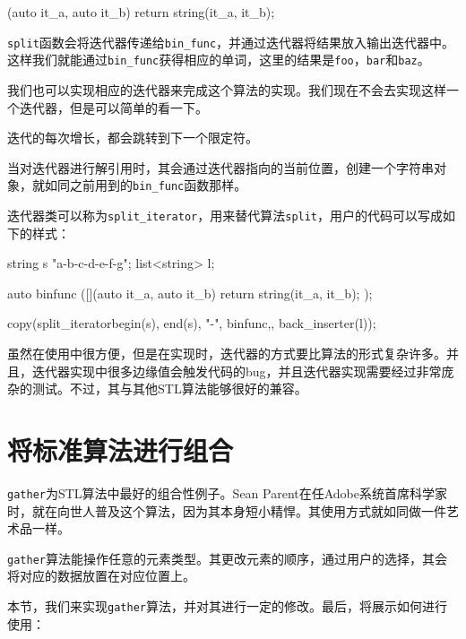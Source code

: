 \begin{codebox}[cpp]
[](auto it_a, auto it_b) {
    return string(it_a, it_b);
}
\end{codebox}

\texttt{split}函数会将迭代器传递给\texttt{bin\_func}，并通过迭代器将结果放入输出迭代器中。这样我们就能通过\texttt{bin\_func}获得相应的单词，这里的结果是\texttt{foo}，\texttt{bar}和\texttt{baz}。


我们也可以实现相应的迭代器来完成这个算法的实现。我们现在不会去实现这样一个迭代器，但是可以简单的看一下。

迭代的每次增长，都会跳转到下一个限定符。

当对迭代器进行解引用时，其会通过迭代器指向的当前位置，创建一个字符串对象，就如同之前用到的\texttt{bin\_func}函数那样。

迭代器类可以称为\texttt{split\_iterator}，用来替代算法\texttt{split}，用户的代码可以写成如下的样式：

\begin{codebox}[cpp]
string s {"a-b-c-d-e-f-g"};
list<string> l;

auto binfunc ([](auto it_a, auto it_b) {
    return string(it_a, it_b);
});

copy(split_iterator{begin(s), end(s), "-", binfunc},{}, back_inserter(l));
\end{codebox}

虽然在使用中很方便，但是在实现时，迭代器的方式要比算法的形式复杂许多。并且，迭代器实现中很多边缘值会触发代码的bug，并且迭代器实现需要经过非常庞杂的测试。不过，其与其他STL算法能够很好的兼容。


\section{将标准算法进行组合}

\texttt{gather}为STL算法中最好的组合性例子。Sean Parent在任Adobe系统首席科学家时，就在向世人普及这个算法，因为其本身短小精悍。其使用方式就如同做一件艺术品一样。

\texttt{gather}算法能操作任意的元素类型。其更改元素的顺序，通过用户的选择，其会将对应的数据放置在对应位置上。


本节，我们来实现\texttt{gather}算法，并对其进行一定的修改。最后，将展示如何进行使用：

